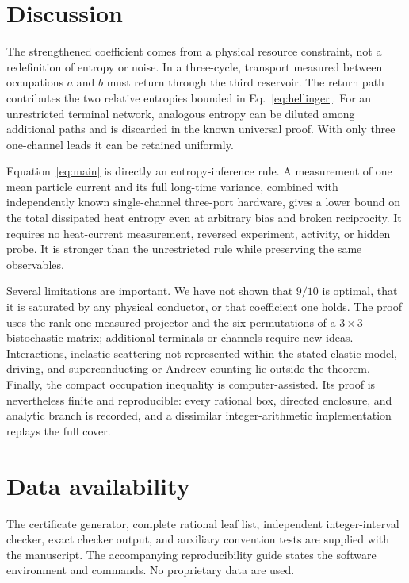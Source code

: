 \documentclass[aps,pra,reprint,superscriptaddress,nofootinbib,longbibliography,floatfix]{revtex4-2}
\begin{document}
\section{Discussion}

The strengthened coefficient comes from a physical resource constraint, not a redefinition of entropy or noise.  In a three-cycle, transport measured between occupations $a$ and $b$ must return through the third reservoir.  The return path contributes the two relative entropies bounded in Eq.~\eqref{eq:hellinger}.  For an unrestricted terminal network, analogous entropy can be diluted among additional paths and is discarded in the known universal proof.  With only three one-channel leads it can be retained uniformly.

Equation~\eqref{eq:main} is directly an entropy-inference rule.  A measurement of one mean particle current and its full long-time variance, combined with independently known single-channel three-port hardware, gives a lower bound on the total dissipated heat entropy even at arbitrary bias and broken reciprocity.  It requires no heat-current measurement, reversed experiment, activity, or hidden probe.  It is stronger than the unrestricted rule while preserving the same observables.

Several limitations are important.  We have not shown that $9/10$ is optimal, that it is saturated by any physical conductor, or that coefficient one holds.  The proof uses the rank-one measured projector and the six permutations of a $3\times3$ bistochastic matrix; additional terminals or channels require new ideas.  Interactions, inelastic scattering not represented within the stated elastic model, driving, and superconducting or Andreev counting lie outside the theorem.  Finally, the compact occupation inequality is computer-assisted.  Its proof is nevertheless finite and reproducible: every rational box, directed enclosure, and analytic branch is recorded, and a dissimilar integer-arithmetic implementation replays the full cover.

\section*{Data availability}

The certificate generator, complete rational leaf list, independent integer-interval checker, exact checker output, and auxiliary convention tests are supplied with the manuscript.  The accompanying reproducibility guide states the software environment and commands.  No proprietary data are used.
\end{document}

